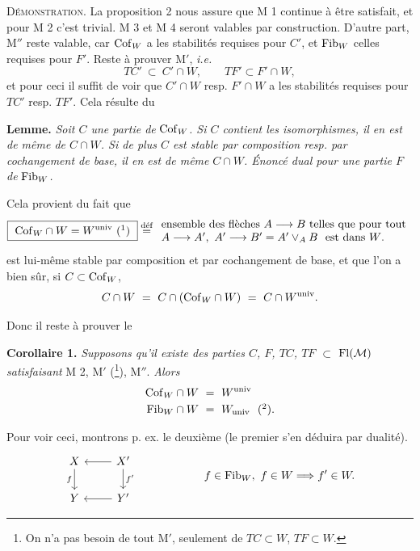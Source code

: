 \textsc{Démonstration}. La proposition 2 nous assure que M 1 continue à être satisfait, et pour M 2 c'est trivial. M 3 et M 4 seront valables par construction. D'autre part, M$''$ reste valable, car $\mathrm{Cof}_W$ a les stabilités requises pour $C'$, et $\mathrm{Fib}_W$ celles requises pour $F'$. Reste à prouver M$'$, \textit{i.e.}
\[
TC'\ \subset\ C'\cap W,\qquad TF'\subset F'\cap W,
\]
et pour ceci il suffit de voir que $C'\cap W$ resp. $F'\cap W$ a les stabilités requises pour $TC'$ resp. $TF'$. Cela résulte du

\textbf{Lemme.} \textit{Soit $C$ une partie de} $\mathrm{Cof}_W$\textit{. Si $C$ contient les isomorphismes, il en est de même de $C\cap W$. Si de plus $C$ est stable par composition resp. par cochangement de base, il en est de même} \textit{$C\cap W$. Énoncé dual pour une partie $F$ de} $\mathrm{Fib}_W$\textit{.}

Cela provient du fait que
\[
\boxed{\ \Cof_W\cap W=W^{\mathrm{univ}}\ (\mbox{\footnotemark})\ }
\stackrel{\text{déf}}{=}
\begin{array}{l}
\text{ensemble des flèches $A\longrightarrow B$ telles que pour tout}\\
A\longrightarrow A',\ A'\longrightarrow B'=A'\vee_A B\ \ \text{est dans $W$.}
\end{array}
\]
est lui-même stable par composition et par cochangement de base, et que l'on a bien sûr, si $C\subset\mathrm{Cof}_W$,
\[
C\cap W\ =\ C\cap(\mathrm{Cof}_W\cap W)\ =\ C\cap W^{\mathrm{univ}}.
\]

Donc il reste à prouver le

\textbf{Corollaire 1.} \textit{Supposons qu'il existe des parties $C$, $F$, $TC$, $TF$ $\subset$} $\mathrm{Fl}(\mathcal{M})$ \textit{satisfaisant} M 2, M$'$ (\footnote{On n'a pas besoin de tout M$'$, seulement de $TC\subset W$, $TF\subset W$.}), M$''$. \textit{Alors}
\[
\begin{aligned}
\Cof_W\cap W\ &=\ W^{\mathrm{univ}}\\
\Fib_W\cap W\ &=\ W_{\mathrm{univ}}\ \ (\mbox{\footnotemark}).
\end{aligned}
\]

Pour voir ceci, montrons p. ex. le deuxième (le premier s'en déduira par dualité).
\[
\begin{tikzcd}
X \ar[d,"f"'] & X' \ar[l] \ar[d,"f'"] \\
Y & Y' \ar[l]
\end{tikzcd}
\qquad\qquad\qquad
f\in\Fib_W,\ f\in W\Longrightarrow f'\in W.
\]

